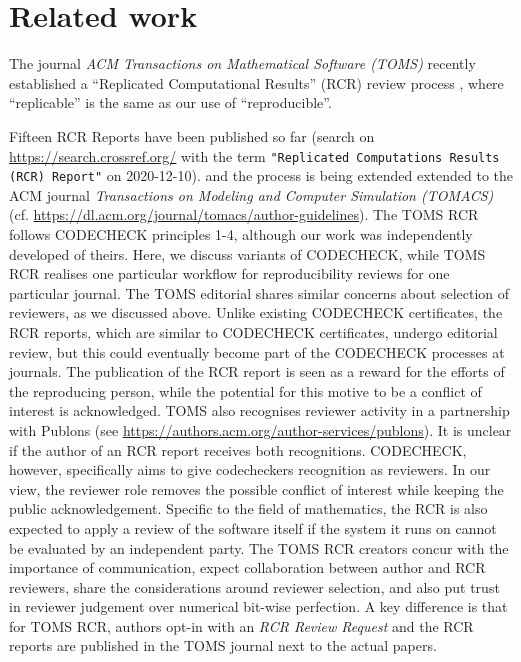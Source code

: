 \documentclass[12pt]{article}
\begin{document}
\section*{Related work}\label{related-work}

The journal \emph{ACM Transactions on Mathematical Software (TOMS)} 
recently established a ``Replicated Computational Results'' (RCR) review process
\cite{heroux_editorial_2015}, where ``replicable'' is the same as our
use of ``reproducible''.  

Fifteen RCR Reports have been published so far (search on 
\url{https://search.crossref.org/} with the term
\texttt{"Replicated Computations Results (RCR) Report"} on 2020-12-10).
and the process is being extended extended to the ACM journal
\emph{Transactions on Modeling and Computer Simulation
  (TOMACS)} (cf. \url{https://dl.acm.org/journal/tomacs/author-guidelines}).
The TOMS RCR follows CODECHECK principles 1-4, although our work was
independently developed of theirs.  Here, we discuss variants of
CODECHECK, while TOMS RCR realises one particular workflow for
reproducibility reviews for one particular journal. The TOMS editorial
\cite{heroux_editorial_2015} shares similar concerns about selection
of reviewers, as we discussed above. Unlike existing CODECHECK
certificates, the RCR reports, which are similar to CODECHECK
certificates, undergo editorial review, but this could eventually
become part of the CODECHECK processes at journals.  The publication
of the RCR report is seen as a reward for the efforts of the
reproducing person, while the potential for this motive to be a
conflict of interest is acknowledged.  TOMS also recognises reviewer
activity in a partnership with Publons
(see \url{https://authors.acm.org/author-services/publons}).
It is unclear if the author of an RCR report receives both recognitions.
CODECHECK, however, specifically aims to give codecheckers
recognition as reviewers.  In our view, the reviewer role removes the
possible conflict of interest while keeping the public
acknowledgement.  Specific to the field of mathematics, the RCR is
also expected to apply a review of the software itself if the system
it runs on cannot be evaluated by an independent party.  The TOMS RCR
creators concur with the importance of communication, expect
collaboration between author and RCR reviewers, share the
considerations around reviewer selection, and also put trust in
reviewer judgement over numerical bit-wise perfection.  A key
difference is that for TOMS RCR, authors opt-in with an \emph{RCR
  Review Request} and the RCR reports are published in the TOMS
journal next to the actual papers.
\end{document}
